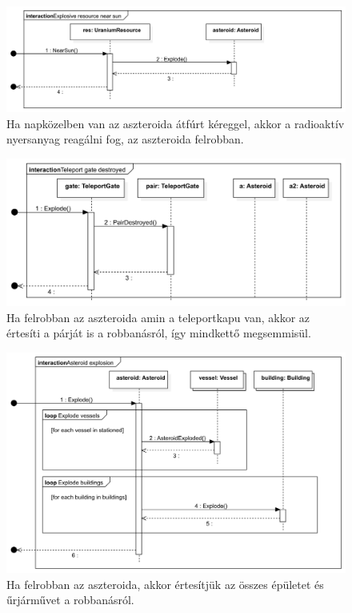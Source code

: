 \begin{figure}[H] 
\centering 
\includegraphics[width=1\textwidth]{docs/3_Project/svg/Design Model!Sun Distance!Resource Explosion!Explosive resource near sun_5.png} 
\caption{Ha napközelben van az aszteroida átfúrt kéreggel, akkor a radioaktív nyersanyag reagálni fog, az aszteroida felrobban.} 
\end{figure} 

\begin{figure}[H] 
\centering 
\includegraphics[width=1\textwidth]{docs/3_Project/svg/Design Model!Sun Distance!Teleport gate destroyed!Teleport gate destroyed_6.png} 
\caption{Ha felrobban az aszteroida amin a teleportkapu van, akkor az értesíti a párját is a robbanásról, így mindkettő megsemmisül.} 
\end{figure} 

\begin{figure}[H] 
\centering 
\includegraphics[width=1\textwidth]{docs/3_Project/svg/Design Model!Sun Distance!Asteroid explosion!Asteroid explosion_7.png} 
\caption{Ha felrobban az aszteroida, akkor értesítjük az összes épületet és űrjárművet a robbanásról.} 
\end{figure} 

